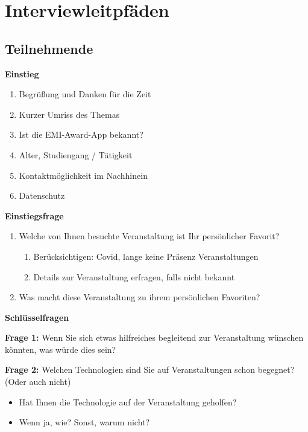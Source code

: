 \setlength{\parskip}{2pt}

\chapter{Interviewleitpfäden} \label{appendix:interview}

\section{Teilnehmende}


\textbf{\large Einstieg}

\begin{enumerate}[noitemsep,topsep=0pt]
    \item Begrüßung und Danken für die Zeit
    \item Kurzer Umriss des Themas
    \item Ist die EMI-Award-App bekannt?
    \item Alter, Studiengang / Tätigkeit
    \item Kontaktmöglichkeit im Nachhinein
    \item Datenschutz
\end{enumerate}


\textbf{\large Einstiegsfrage}

\begin{enumerate}[noitemsep,topsep=0pt]
    \item {
        Welche von Ihnen besuchte Veranstaltung ist Ihr persönlicher Favorit?
        \begin{enumerate}[noitemsep,topsep=0pt]
            \item Berücksichtigen: Covid, lange keine Präsenz Veranstaltungen
            \item Details zur Veranstaltung erfragen, falls nicht bekannt
        \end{enumerate}
        }
    \item Was macht diese Veranstaltung zu ihrem persönlichen Favoriten?
\end{enumerate}


\textbf{\large Schlüsselfragen}

\textbf{Frage 1:} Wenn Sie sich etwas hilfreiches begleitend zur Veranstaltung wünschen könnten, was würde dies sein?

\textbf{Frage 2:} Welchen Technologien sind Sie auf Veranstaltungen schon begegnet? (Oder auch nicht)
\begin{itemize}[noitemsep,topsep=0pt]
    \item Hat Ihnen die Technologie auf der Veranstaltung geholfen?
    \item Wenn ja, wie? Sonst, warum nicht?
\end{itemize}

